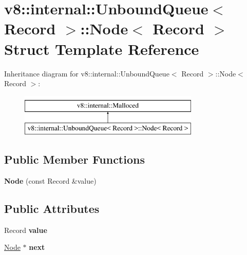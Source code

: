 \hypertarget{structv8_1_1internal_1_1UnboundQueue_1_1Node}{}\section{v8\+:\+:internal\+:\+:Unbound\+Queue$<$ Record $>$\+:\+:Node$<$ Record $>$ Struct Template Reference}
\label{structv8_1_1internal_1_1UnboundQueue_1_1Node}
Inheritance diagram for v8\+:\+:internal\+:\+:Unbound\+Queue$<$ Record $>$\+:\+:Node$<$ Record $>$\+:\begin{figure}[H]
\begin{center}
\leavevmode
\includegraphics[height=2.000000cm]{structv8_1_1internal_1_1UnboundQueue_1_1Node}
\end{center}
\end{figure}
\subsection*{Public Member Functions}
\begin{DoxyCompactItemize}
\item 
\mbox{\label{structv8_1_1internal_1_1UnboundQueue_1_1Node_a8db4d3f3a4919f1ebe5a9063f24d3287}} 
{\bfseries Node} (const Record \&value)
\end{DoxyCompactItemize}
\subsection*{Public Attributes}
\begin{DoxyCompactItemize}
\item 
\mbox{\label{structv8_1_1internal_1_1UnboundQueue_1_1Node_a6bebe433a4b64664f0e52662f49a180b}} 
Record {\bfseries value}
\item 
\mbox{\label{structv8_1_1internal_1_1UnboundQueue_1_1Node_a676333633370491807e937e24e7694b7}} 
\mbox{\hyperlink{structv8_1_1internal_1_1UnboundQueue_1_1Node}{Node}} $\ast$ {\bfseries next}
\end{DoxyCompactItemize}
